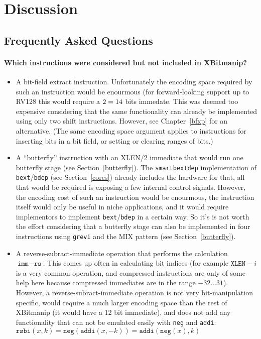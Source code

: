 \chapter{Discussion}

\section{Frequently Asked Questions}

\subsubsection{Which instructions were considered but not included in XBitmanip?}

\begin{itemize}
\item A bit-field extract instruction. Unfortunately the encoding space required
by such an instruction would be enourmous (for forward-looking support up to
RV128 this would require a $2 \time 7 = 14$ bits immedate. This was deemed
too expensive considering that the same functionality can already be implemented
using only two shift instructions. However, see Chapter~\ref{bfxp} for an
alternative. (The same encoding space argument applies to instructions for
inserting bits in a bit field, or setting or clearing ranges of bits.)

\item A ``butterfly'' instruction with an XLEN/2 immediate that would run one
butterfly stage (see Section~\ref{butterfly}). The {\tt smartbextdep} implementation
of {\tt bext}/{\tt bdep} (see Section~\ref{cores}) already includes the hardware
for that, all that would be required is exposing a few internal control signals.
However, the encoding cost of such an instruction would be enourmous, the
instruction itself would only be useful in niche applications, and it would require
implementors to implement {\tt bext}/{\tt bdep} in a certain way. So it's is
not worth the effort considering that a butterfly stage can also be implemented in
four instructions using {\tt grevi} and the MIX pattern (see Section~\ref{butterfly}).

\item A reverse-subract-immediate operation that performs the calculation
$\texttt{imm} - \texttt{rs}$.  This comes up often in calculating bit indices
(for example $\texttt{XLEN} - i$ is a very common operation, and compressed
instructions are only of some help here because compressed immediates are in
the range $-32 \dots 31$). However, a reverse-subract-immediate operation is
not very bit-manipulation specific, would require a much larger encoding
space than the rest of XBitmanip (it would have a 12 bit immediate), and
does not add any functionality that can not be emulated easily with {\tt neg} and
{\tt addi}: $\texttt{rsbi}(x, k) = \texttt{neg}(\texttt{addi}(x, -k)) = \texttt{addi}(\texttt{neg}(x), k)$


\end{itemize}

